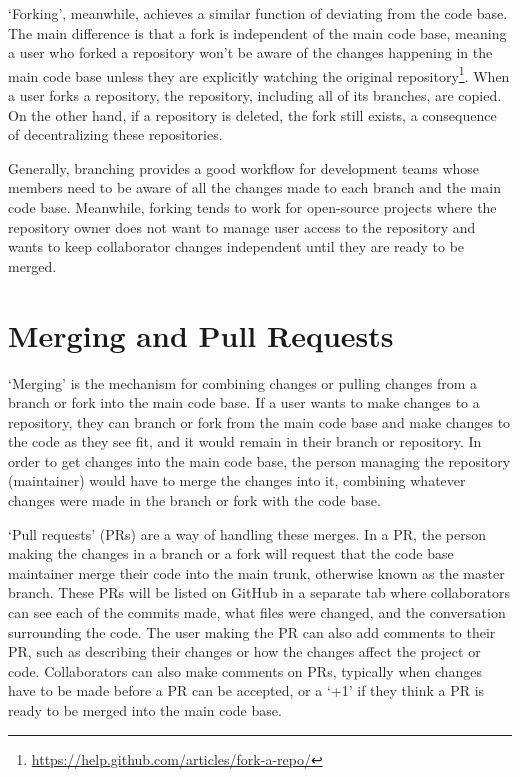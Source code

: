 `Forking', meanwhile, achieves a similar function of deviating from the code base. The main difference is that a fork is independent of the main code base, meaning a user who forked a repository won't be aware of the changes happening in the main code base unless they are explicitly watching the original repository\footnote{\url{https://help.github.com/articles/fork-a-repo/}}. When a user forks a repository, the repository, including all of its branches, are copied. On the other hand, if a repository is deleted, the fork still exists, a consequence of decentralizing these repositories.

Generally, branching provides a good workflow for development teams whose members need to be aware of all the changes made to each branch and the main code base. Meanwhile, forking tends to work for open-source projects where the repository owner does not want to manage user access to the repository and wants to keep collaborator changes independent until they are ready to be merged.

\section{Merging and Pull Requests}
`Merging' is the mechanism for combining changes or pulling changes from a branch or fork into the main code base. If a user wants to make changes to a repository, they can branch or fork from the main code base and make changes to the code as they see fit, and it would remain in their branch or repository. In order to get changes into the main code base, the person managing the repository (maintainer) would have to merge the changes into it, combining whatever changes were made in the branch or fork with the code base.

`Pull requests' (PRs) are a way of handling these merges. In a PR, the person making the changes in a branch or a fork will request that the code base maintainer merge their code into the main trunk, otherwise known as the master branch. These PRs will be listed on GitHub in a separate tab where collaborators can see each of the commits made, what files were changed, and the conversation surrounding the code. The user making the PR can also add comments to their PR, such as describing their changes or how the changes affect the project or code. Collaborators can also make comments on PRs, typically when changes have to be made before a PR can be accepted, or a `+1' if they think a PR is ready to be merged into the main code base.

